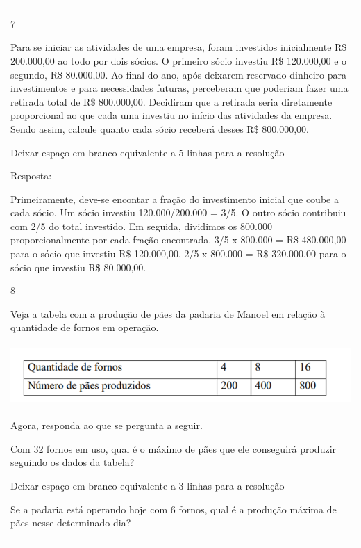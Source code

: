 \begin{mdframed}[linewidth=2pt,linecolor=salmao,roundcorner=2pt]
\begin{escolha}
{{{\begin{longtable}[]{@{}l@{}}
\begin{itemize}
\num{7}

Para se iniciar as atividades de uma empresa, foram investidos
inicialmente R\$ 200.000,00 ao todo por dois sócios. O primeiro
sócio investiu R\$ 120.000,00 e o segundo, R\$ 80.000,00. Ao final do ano,
após deixarem reservado dinheiro para investimentos e para necessidades
futuras, perceberam que poderiam fazer uma retirada total de R\$ 800.000,00. Decidiram que a retirada seria diretamente proporcional ao que
cada uma investiu no início das atividades da empresa. Sendo assim,
calcule quanto cada sócio receberá desses R\$ 800.000,00.

Deixar espaço em branco equivalente a 5 linhas para a resolução

Resposta:

Primeiramente, deve-se encontar a fração do investimento inicial que
coube a cada sócio.
Um sócio investiu 120.000/200.000 = 3/5.
O outro sócio contribuiu com 2/5 do total investido.
Em seguida, dividimos os 800.000 proporcionalmente por cada fração encontrada.
3/5 x 800.000 = R\$ 480.000,00 para o sócio que investiu R\$ 120.000,00.
2/5 x 800.000 = R\$ 320.000,00 para o sócio que investiu R\$ 80.000,00.

\num{8}

Veja a tabela com a produção de pães da padaria de Manoel em
relação à quantidade de fornos em operação.


\includegraphics[width=5.90556in,height=0.92222in]{media/image131.png}

Agora, responda ao que se pergunta a seguir.

\begin{escolha}
\item
  Com 32 fornos em uso, qual é o máximo de pães que ele conseguirá
  produzir seguindo os dados da tabela?
\end{escolha}

Deixar espaço em branco equivalente a 3 linhas para a resolução

\begin{escolha}
\item
  Se a padaria está operando hoje com 6 fornos, qual é a produção máxima
  de pães nesse determinado dia?
\end{escolha}


\end{itemize}
\end{longtable}}}}
\end{escolha}
\end{mdframed}
